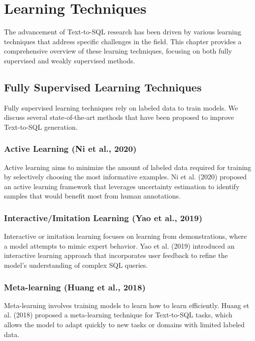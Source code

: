 \section{Learning Techniques}

The advancement of Text-to-SQL research has been driven by various learning techniques that address specific challenges in the field. This chapter provides a comprehensive overview of these learning techniques, focusing on both fully supervised and weakly supervised methods.

\subsection{Fully Supervised Learning Techniques}

Fully supervised learning techniques rely on labeled data to train models. We discuss several state-of-the-art methods that have been proposed to improve Text-to-SQL generation.

\subsubsection{Active Learning (Ni et al., 2020)}

Active learning aims to minimize the amount of labeled data required for training by selectively choosing the most informative examples. Ni et al. (2020) proposed an active learning framework that leverages uncertainty estimation to identify samples that would benefit most from human annotations.

\subsubsection{Interactive/Imitation Learning (Yao et al., 2019)}

Interactive or imitation learning focuses on learning from demonstrations, where a model attempts to mimic expert behavior. Yao et al. (2019) introduced an interactive learning approach that incorporates user feedback to refine the model's understanding of complex SQL queries.

\subsubsection{Meta-learning (Huang et al., 2018)}

Meta-learning involves training models to learn how to learn efficiently. Huang et al. (2018) proposed a meta-learning technique for Text-to-SQL tasks, which allows the model to adapt quickly to new tasks or domains with limited labeled data.

